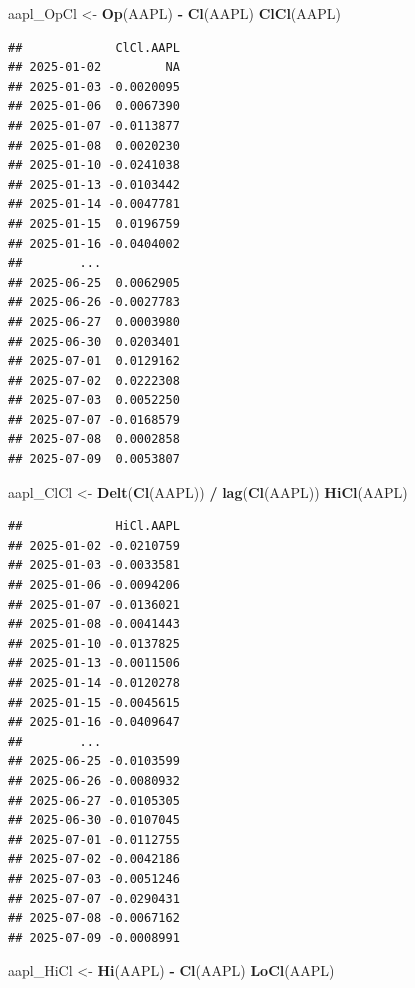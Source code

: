 \documentclass[]{ctexbook}
\newenvironment{Shaded}{\begin{snugshade}}{\end{snugshade}}
\newcommand{\FunctionTok}[1]{\textcolor[rgb]{0.13,0.29,0.53}{\textbf{#1}}}
\newcommand{\NormalTok}[1]{#1}
\newcommand{\OtherTok}[1]{\textcolor[rgb]{0.56,0.35,0.01}{#1}}
\newcommand{\SpecialCharTok}[1]{\textcolor[rgb]{0.81,0.36,0.00}{\textbf{#1}}}
\begin{document}
\begin{Shaded}
\begin{Highlighting}[]
\NormalTok{aapl\_OpCl }\OtherTok{\textless{}{-}} \FunctionTok{Op}\NormalTok{(AAPL) }\SpecialCharTok{{-}} \FunctionTok{Cl}\NormalTok{(AAPL)}
\FunctionTok{ClCl}\NormalTok{(AAPL)}
\end{Highlighting}
\end{Shaded}

\begin{verbatim}
##             ClCl.AAPL
## 2025-01-02         NA
## 2025-01-03 -0.0020095
## 2025-01-06  0.0067390
## 2025-01-07 -0.0113877
## 2025-01-08  0.0020230
## 2025-01-10 -0.0241038
## 2025-01-13 -0.0103442
## 2025-01-14 -0.0047781
## 2025-01-15  0.0196759
## 2025-01-16 -0.0404002
##        ...           
## 2025-06-25  0.0062905
## 2025-06-26 -0.0027783
## 2025-06-27  0.0003980
## 2025-06-30  0.0203401
## 2025-07-01  0.0129162
## 2025-07-02  0.0222308
## 2025-07-03  0.0052250
## 2025-07-07 -0.0168579
## 2025-07-08  0.0002858
## 2025-07-09  0.0053807
\end{verbatim}

\begin{Shaded}
\begin{Highlighting}[]
\NormalTok{aapl\_ClCl }\OtherTok{\textless{}{-}} \FunctionTok{Delt}\NormalTok{(}\FunctionTok{Cl}\NormalTok{(AAPL)) }\SpecialCharTok{/} \FunctionTok{lag}\NormalTok{(}\FunctionTok{Cl}\NormalTok{(AAPL))}
\FunctionTok{HiCl}\NormalTok{(AAPL)}
\end{Highlighting}
\end{Shaded}

\begin{verbatim}
##             HiCl.AAPL
## 2025-01-02 -0.0210759
## 2025-01-03 -0.0033581
## 2025-01-06 -0.0094206
## 2025-01-07 -0.0136021
## 2025-01-08 -0.0041443
## 2025-01-10 -0.0137825
## 2025-01-13 -0.0011506
## 2025-01-14 -0.0120278
## 2025-01-15 -0.0045615
## 2025-01-16 -0.0409647
##        ...           
## 2025-06-25 -0.0103599
## 2025-06-26 -0.0080932
## 2025-06-27 -0.0105305
## 2025-06-30 -0.0107045
## 2025-07-01 -0.0112755
## 2025-07-02 -0.0042186
## 2025-07-03 -0.0051246
## 2025-07-07 -0.0290431
## 2025-07-08 -0.0067162
## 2025-07-09 -0.0008991
\end{verbatim}

\begin{Shaded}
\begin{Highlighting}[]
\NormalTok{aapl\_HiCl }\OtherTok{\textless{}{-}} \FunctionTok{Hi}\NormalTok{(AAPL) }\SpecialCharTok{{-}} \FunctionTok{Cl}\NormalTok{(AAPL)}
\FunctionTok{LoCl}\NormalTok{(AAPL)}
\end{Highlighting}
\end{Shaded}
\end{document}
